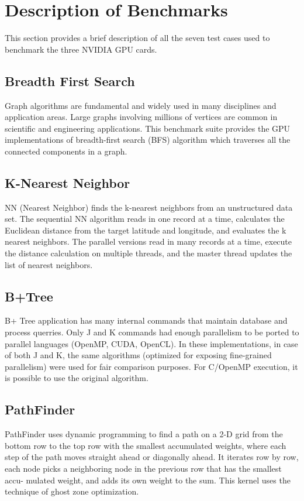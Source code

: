 \documentclass[paper=a4, fontsize=11pt]{scrartcl}
\numberwithin{equation}{section}		%
\numberwithin{figure}{section}			%
\numberwithin{table}{section}				%
\begin{document}
\newpage
\section{Description of Benchmarks}
This section provides a brief description of all the seven test cases used 
to benchmark the three NVIDIA GPU cards.

\subsection{Breadth First Search}
Graph algorithms are fundamental and widely used in many disciplines and application areas. Large graphs involving millions of vertices are common in scientific and engineering applications. This benchmark suite provides the GPU implementations of breadth-first search (BFS) algorithm which traverses all the connected components in a graph.

\subsection{K-Nearest Neighbor}
NN (Nearest Neighbor) finds the k-nearest neighbors from an unstructured data set. The sequential NN algorithm reads in one record at a time, calculates the Euclidean distance from the target latitude and longitude, and evaluates the k nearest neighbors. The parallel versions read in many records at a time, execute the distance calculation on multiple threads, and the master thread updates the list of nearest neighbors.

\subsection{B+Tree}
B+ Tree application has many internal commands that maintain database and process querries. Only J and K commands had enough parallelism to be ported to parallel languages (OpenMP, CUDA, OpenCL). In these implementations, in case of both J and K, the same algorithms (optimized for exposing fine-grained parallelism) were used for fair comparison purposes. For C/OpenMP execution, it is possible to use the original algorithm.

\subsection{PathFinder}
PathFinder uses dynamic programming to find a path on a 2-D grid from the bottom row to the top row with the smallest accumulated weights, where each step of the path moves straight ahead or diagonally ahead. It iterates row by row, each node picks a neighboring node in the previous row that has the smallest accu- mulated weight, and adds its own weight to the sum.
This kernel uses the technique of ghost zone optimization.
\end{document}
